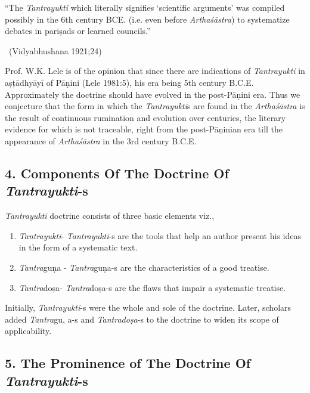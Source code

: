 “The \textit{Tantrayukti} which literally signifies ‘scientific arguments’ was compiled possibly in the 6th century BCE. (i.e. even before \textit{Arthaśāstra}) to systematize debates in pariṣads or learned councils.”

~\hfill (Vidyabhushana 1921;24)

Prof. W.K. Lele is of the opinion that since there are indications of \textit{Tantrayukti} in aṣṭādhyāyī of Pāṇini (Lele 1981:5), his era being 5th century B.C.E. Approximately the doctrine should have evolved in the post-Pāṇini era. Thus we conjecture that the form in which the \textit{Tantrayukti}s are found in the \textit{Arthaśāstra} is the result of continuous rumination and evolution over centuries, the literary evidence for which is not traceable, right from the post-Pāṇinian era till the appearance of \textit{Arthaśāstra} in the 3rd century B.C.E.


\subsection*{4. Components Of The Doctrine Of \textit{Tantrayukti}-s}

\textit{Tantrayukti} doctrine consists of three basic elements viz.,

\begin{enumerate}[{\rm a.}]
\itemsep=0pt
\item \textit{Tantrayukti}- \textit{Tantrayukti}-s are the tools that help an author present his ideas in the form of a systematic text.

 \item \textit{Tantra}guṇa - \textit{Tantra}guṇa-s are the characteristics of a good treatise.

 \item \textit{Tantra}doṣa- \textit{Tantra}doṣa-s are the flaws that impair a systematic treatise.

\end{enumerate}

Initially, \textit{Tantrayukti}-s were the whole and sole of the doctrine. Later, scholars added \textit{Tantra}gu, a-s and \textit{Tantradoṣa}-s to the doctrine to widen its scope of applicability.

\newpage


\subsection*{5. The Prominence of The Doctrine Of \textit{Tantrayukti}-s}

